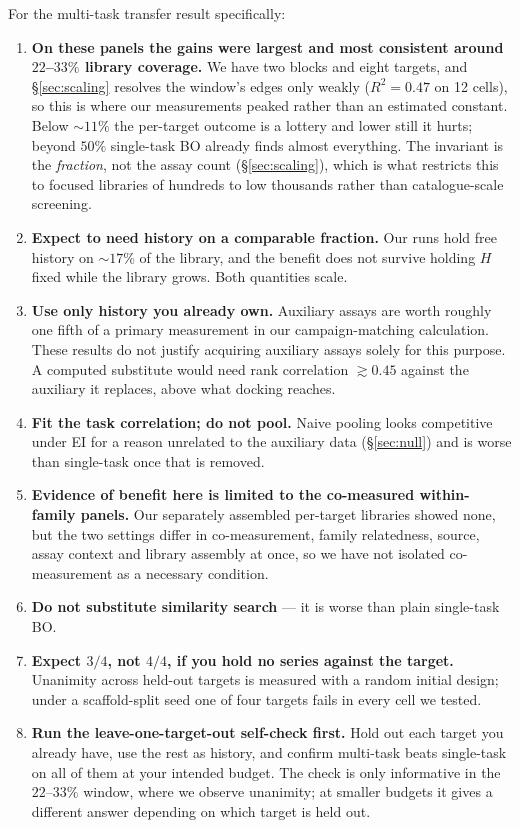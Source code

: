 \documentclass[11pt]{article}
\begin{document}
For the multi-task transfer result specifically:

\begin{enumerate}[leftmargin=1.6em,itemsep=0.2em]
  \item \textbf{On these panels the gains were largest and most consistent
    around $22$--$33\%$ library coverage.} We have two blocks and eight
    targets, and \S\ref{sec:scaling} resolves the window's edges only weakly
    ($R^2 = 0.47$ on 12 cells), so this is where our measurements peaked rather
    than an estimated constant. Below ${\sim}11\%$ the
    per-target outcome is a lottery and lower still it hurts; beyond $50\%$
    single-task BO already finds almost everything. The invariant is the
    \emph{fraction}, not the assay count (\S\ref{sec:scaling}), which is what
    restricts this to focused libraries of hundreds to low thousands rather than
    catalogue-scale screening.
  \item \textbf{Expect to need history on a comparable fraction.} Our runs hold
    free history on ${\sim}17\%$ of the library, and the benefit does not
    survive holding $H$ fixed while the library grows. Both quantities scale.
  \item \textbf{Use only history you already own.} Auxiliary assays are worth
    roughly one fifth of a primary measurement in our campaign-matching
    calculation. These results do not justify acquiring auxiliary assays solely
    for this purpose. A computed
    substitute would need rank correlation ${\gtrsim}0.45$ against the auxiliary it
    replaces, above what docking reaches.
  \item \textbf{Fit the task correlation; do not pool.} Naive pooling looks
    competitive under EI for a reason unrelated to the auxiliary data
    (\S\ref{sec:null}) and is worse than single-task once that is removed.
  \item \textbf{Evidence of benefit here is limited to the co-measured
    within-family panels.} Our separately assembled per-target libraries showed
    none, but the two settings differ in co-measurement, family relatedness,
    source, assay context and library assembly at once, so we have not isolated
    co-measurement as a necessary condition.
  \item \textbf{Do not substitute similarity search} --- it is worse than plain
    single-task BO.
  \item \textbf{Expect $3/4$, not $4/4$, if you hold no series against the
    target.} Unanimity across held-out targets is measured with a random
    initial design; under a scaffold-split seed one of four targets fails in
    every cell we tested.
  \item \textbf{Run the leave-one-target-out self-check first.} Hold out each
    target you already have, use the rest as history, and confirm multi-task
    beats single-task on all of them at your intended budget. The check is only
    informative in the $22$--$33\%$ window, where we observe unanimity; at
    smaller budgets it gives a different answer depending on which target is
    held out.
\end{enumerate}
\end{document}
